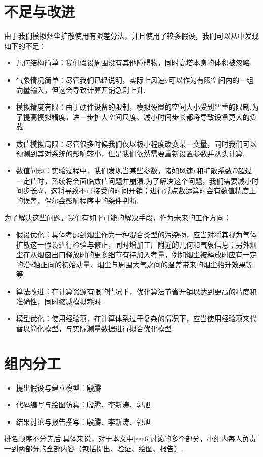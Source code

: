 \documentclass{article}
\begin{document}
	\section{不足与改进}
	\noindent 由于我们模拟烟尘扩散使用有限差分法，并且使用了较多假设，我们可以从中发现如下的不足：
	\begin{itemize}
		\item 几何结构简单：我们假设周围没有其他障碍物，同时高塔本身的体积被忽略.
		\item 气象情况简单：尽管我们已经说明，实际上风速v可以作为有限空间内的一组向量输入，但这会导致计算开销急剧上升.
		\item 模拟精度有限：由于硬件设备的限制，模拟设置的空间大小受到严重的限制.为了提高模拟精度，进一步扩大空间尺度、减小时间步长都将导致设备更大的负载.
		\item 数值模拟局限：尽管很多时候我们仅以极小程度改变某一变量，同时我们可以预测到其对系统的影响较小，但是我们依然需要重新设置参数并从头计算.
		\item 数值问题：实验过程中，我们发现当某些参数，诸如风速$v$和扩散系数$D$超过一定值时，系统将会面临数值问题并崩溃.为了解决这个问题，我们需要减小时间步长$dt$，这将导致不可接受的时间开销；进行浮点数运算时会有数值精度上的误差，偶尔会影响程序中的条件判断.
	\end{itemize}
	为了解决这些问题，我们有如下可能的解决手段，作为未来的工作方向：
	\begin{itemize}
		\item 假设优化：具体考虑到烟尘作为一种混合类型的污染物，应当对将其视为气体扩散这一假设进行检验与修正，同时增加工厂附近的几何和气象信息；另外烟尘在从烟囱出口释放时的更多细节有待加入考量，例如烟尘被释放时应有一定的沿z轴正向的初始动量、烟尘与周围大气之间的温差带来的烟尘抬升效果等等.
		\item 算法改进：在计算资源有限的情况下，优化算法节省开销以达到更高的精度和准确性，同时缩减模拟耗时.
		\item 模型优化：使用经验项，在计算体系过于复杂的情况下，应当使用经验项来代替以简化模型，与实际测量数据进行拟合优化模型.
	\end{itemize}

	\section{组内分工}
	
	\begin{itemize}
		\item 提出假设与建立模型：殷腾
		\item 代码编写与绘图仿真：殷腾、李新涛、郭旭
		\item 结果讨论与报告撰写：殷腾、李新涛、郭旭
	\end{itemize}
	排名顺序不分先后.具体来说，对于本文中\cref{sec6}讨论的多个部分，小组内每人负责一到两部分的全部内容（包括提出、验证、绘图、报告）.
	
\end{document}
